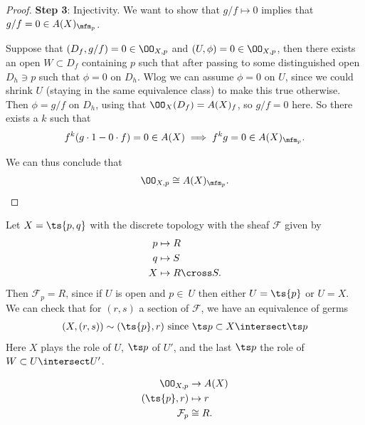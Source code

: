 \begin{proof}
\textbf{Step 3}: Injectivity. We want to show that \(g/f\mapsto 0\)
implies that \(g/f = 0 \in A(X)_{\mfm_p}\).

Suppose that \((D_f, g/f) = 0 \in \OO_{X, p}\) and
\((U, \phi) = 0 \in \OO_{X,p}\), then there exists an open
\(W\subset D_f\) containing \(p\) such that after passing to some
distinguished open \(D_h\ni p\) such that \(\phi = 0\) on \(D_h\). Wlog
we can assume \(\phi = 0\) on \(U\), since we could shrink \(U\)
(staying in the same equivalence class) to make this true otherwise.
Then \(\phi = g/f\) on \(D_h\), using that \(\OO_X(D_f) = A(X)_f\), so
\(g/f = 0\) here. So there exists a \(k\) such that
\begin{align*}  
f^k(g\cdot 1 - 0\cdot f) = 0 \in A(X) \implies f^k g=0 \in A(X)_{\mfm_p}
.\end{align*}

We can thus conclude that
\begin{align*}  
\OO_{X, p} \cong A(X)_{\mfm_p}
.\end{align*}

\end{proof}

\begin{example}

Let \(X = \ts{p, q}\) with the discrete topology with the sheaf
\(\mathcal{F}\) given by
\begin{align*}  
p &\mapsto R \\
q &\mapsto S \\
X &\mapsto R\cross S
.\end{align*} Then \(\mathcal{F}_p = R\), since if \(U\) is open and
\(p\in\ U\) then either \(U= \ts{p}\) or \(U = X\). We can check that
for \((r, s)\) a section of \(\mathcal{F}\), we have an equivalence of
germs
\begin{align*}
(X, (r, s)) \sim (\ts{p}, r) \text{ since } \ts p \subset X\intersect \ts p
\end{align*} Here \(X\) plays the role of \(U\), \(\ts p\) of \(U'\),
and the last \(\ts p\) the role of \(W \subset U\intersect U'\).

\begin{align*}  
\OO_{X, p} &\to A(X) \\
(\ts{p}, r) &\mapsto r \\
\mathcal{F}_p &\cong R
.\end{align*}

\end{example}


